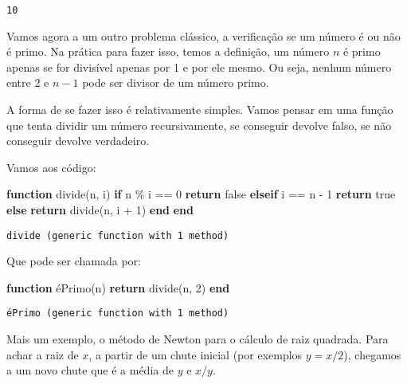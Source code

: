 \documentclass[
  letterpaper,
  DIV=11,
  numbers=noendperiod]{scrreprt}
\newenvironment{Shaded}{\begin{snugshade}}{\end{snugshade}}
\newcommand{\ConstantTok}[1]{\textcolor[rgb]{0.56,0.35,0.01}{#1}}
\newcommand{\ControlFlowTok}[1]{\textcolor[rgb]{0.00,0.23,0.31}{\textbf{#1}}}
\newcommand{\FloatTok}[1]{\textcolor[rgb]{0.68,0.00,0.00}{#1}}
\newcommand{\FunctionTok}[1]{\textcolor[rgb]{0.28,0.35,0.67}{#1}}
\newcommand{\KeywordTok}[1]{\textcolor[rgb]{0.00,0.23,0.31}{\textbf{#1}}}
\newcommand{\NormalTok}[1]{\textcolor[rgb]{0.00,0.23,0.31}{#1}}
\newcommand{\OperatorTok}[1]{\textcolor[rgb]{0.37,0.37,0.37}{#1}}
\begin{document}
\begin{verbatim}
10
\end{verbatim}

Vamos agora a um outro problema clássico, a verificação se um número é
ou não é primo. Na prática para fazer isso, temos a definição, um número
\(n\) é primo apenas se for divisível apenas por 1 e por ele mesmo. Ou
seja, nenhum número entre 2 e \(n - 1\) pode ser divisor de um número
primo.

A forma de se fazer isso é relativamente simples. Vamos pensar em uma
função que tenta dividir um número recursivamente, se conseguir devolve
falso, se não conseguir devolve verdadeiro.

Vamos aos código:

\begin{Shaded}
\begin{Highlighting}[]
\KeywordTok{function} \FunctionTok{divide}\NormalTok{(n, i)}
    \ControlFlowTok{if}\NormalTok{ n }\OperatorTok{\%}\NormalTok{ i }\OperatorTok{==} \FloatTok{0}
        \ControlFlowTok{return} \ConstantTok{false}
    \ControlFlowTok{elseif}\NormalTok{ i }\OperatorTok{==}\NormalTok{ n }\OperatorTok{{-}} \FloatTok{1}
        \ControlFlowTok{return} \ConstantTok{true}
    \ControlFlowTok{else}
        \ControlFlowTok{return} \FunctionTok{divide}\NormalTok{(n, i }\OperatorTok{+} \FloatTok{1}\NormalTok{)}
    \ControlFlowTok{end}
\KeywordTok{end}
\end{Highlighting}
\end{Shaded}

\begin{verbatim}
divide (generic function with 1 method)
\end{verbatim}

Que pode ser chamada por:

\begin{Shaded}
\begin{Highlighting}[]
\KeywordTok{function} \FunctionTok{éPrimo}\NormalTok{(n)}
    \ControlFlowTok{return} \FunctionTok{divide}\NormalTok{(n, }\FloatTok{2}\NormalTok{)}
\KeywordTok{end}
\end{Highlighting}
\end{Shaded}

\begin{verbatim}
éPrimo (generic function with 1 method)
\end{verbatim}

Mais um exemplo, o método de Newton para o cálculo de raiz quadrada.
Para achar a raiz de \(x\), a partir de um chute inicial (por exemplos
\(y= x /2\)), chegamos a um novo chute que é a média de \(y\) e \(x/y\).
\end{document}
